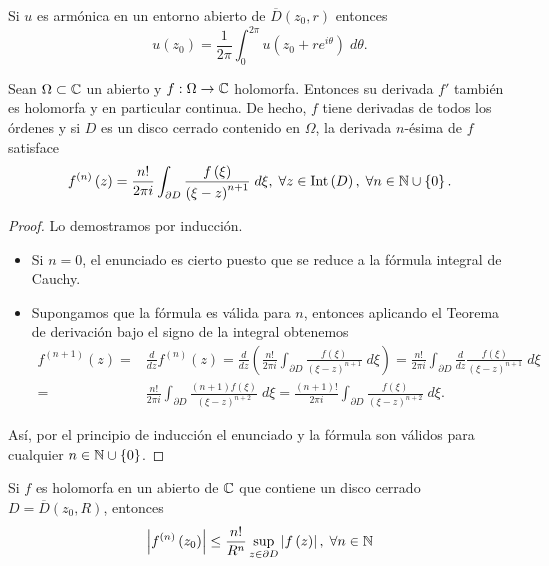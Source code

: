 \begin{colorary}
Si $\displaystyle u $ es armónica en un entorno abierto de $\displaystyle \overline{D}\left(z_{0}, r\right) $ entonces
\[u\left(z_{0}\right)=\frac{1}{2\pi }\int^{2\pi }_{0} u\left(z_{0}+re^{i\theta }\right) \; d\theta  .\]
\end{colorary}
\begin{theorem}
Sean $\displaystyle \Omega \subset \mathbb{C} $ un abierto y $\displaystyle f : \Omega \to \mathbb{C} $ holomorfa. Entonces su derivada $\displaystyle f' $ también es holomorfa y en particular continua. De hecho, $\displaystyle f $ tiene derivadas de todos los órdenes y si $\displaystyle D $ es un disco cerrado contenido en $\displaystyle \Omega  $, la derivada $\displaystyle n $-ésima de $\displaystyle f $ satisface
\[f^{\left(n\right)}\left(z\right)=\frac{n!}{2\pi i}\int _{\partial D}\frac{f\left(\xi\right)}{\left(\xi-z\right)^{n+1}} \; d\xi ,\; \forall z \in \operatorname{Int}\left(D\right), \; \forall n \in \mathbb{N} \cup \left\{ 0\right\}. \]
\end{theorem}
\begin{proof}
Lo demostramos por inducción. 
\begin{itemize}
\item Si $\displaystyle n = 0 $, el enunciado es cierto puesto que se reduce a la fórmula integral de Cauchy.
\item Supongamos que la fórmula es válida para $\displaystyle n $, entonces aplicando el Teorema de derivación bajo el signo de la integral obtenemos 
	\[
	\begin{split}
		f^{\left(n+1\right)}\left(z\right)=&\frac{d}{dz}f^{\left(n\right)}\left(z\right) =\frac{d}{dz}\left(\frac{n!}{2\pi i}\int _{\partial D}\frac{f\left(\xi\right)}{\left(\xi-z\right)^{n+1}} \; d\xi\right)=\frac{n!}{2\pi i}\int _{\partial D}\frac{d}{dz}\frac{f\left(\xi\right)}{\left(\xi-z\right)^{n+1}} \; d\xi \\
		= & \frac{n!}{2\pi i}\int _{\partial D}\frac{\left(n+1\right)f\left(\xi\right)}{\left(\xi-z\right)^{n+2}} \; d\xi=\frac{\left(n+1\right)!}{2\pi i}\int _{\partial D}\frac{f\left(\xi\right)}{\left(\xi-z\right)^{n+2}} \; d\xi.
	\end{split}
	\]
\end{itemize}
Así, por el principio de inducción el enunciado y la fórmula son válidos para cualquier $\displaystyle n \in \mathbb{N} \cup \left\{ 0\right\}  $.
\end{proof}
\begin{colorary}
Si $\displaystyle f $ es holomorfa en un abierto de $\displaystyle \mathbb{C} $ que contiene un disco cerrado $\displaystyle D = \overline{D}\left(z_{0}, R\right) $, entonces
\[ \left|f^{\left(n\right)}\left(z_{0}\right)\right| \leq \frac{n!}{R^{n}}\sup_{z \in \partial D} \left|f\left(z\right)\right| , \; \forall n \in \mathbb{N}\]
\end{colorary}
